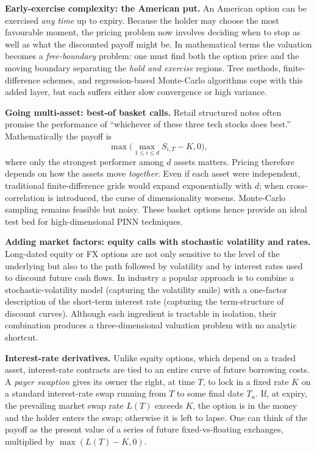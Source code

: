\documentclass[12pt]{report} %
\theoremstyle{plain}           %
\theoremstyle{definition}      %
\theoremstyle{remark}          %
\begin{document}
\medskip
\noindent\textbf{Early-exercise complexity: the American put.}
An American option can be exercised \emph{any time} up to expiry. Because the holder may choose
the most favourable moment, the pricing problem now involves deciding when to stop as well as
what the discounted payoff might be.  In mathematical terms the valuation becomes a
\emph{free-boundary} problem: one must find both the option price and the moving boundary
separating the \emph{hold and exercise} regions. Tree methods, finite-difference schemes, and
regression-based Monte-Carlo algorithms cope with this added layer, but each suffers either
slow convergence or high variance.

\medskip
\noindent\textbf{Going multi-asset: best-of basket calls.}
Retail structured notes often promise the performance of “whichever of these three tech stocks
does best.”  Mathematically the payoff is
\[
\max\bigl(\max_{1\le i\le d}S_{i,T}-K,0\bigr),
\]
where only the strongest performer among \(d\) assets matters.  Pricing therefore depends on
how the assets move \emph{together}.  
Even if each asset were independent, traditional finite-difference grids would expand
exponentially with \(d\); when cross-correlation is introduced, the curse of dimensionality
worsens. Monte-Carlo sampling remains feasible but noisy. These basket options hence provide an ideal test bed
for high-dimensional PINN techniques.

\medskip
\noindent\textbf{Adding market factors: equity calls with stochastic volatility and rates.}
Long-dated equity or FX options are not only sensitive to the level of the underlying
but also to the path followed by volatility and by interest rates used to discount future
cash flows. In industry a popular approach is to combine a
stochastic-volatility model (capturing the volatility smile) with a one-factor
description of the short-term interest rate (capturing the term-structure of discount
curves).  Although each ingredient is tractable in isolation, their combination produces a
three-dimensional valuation problem with no analytic shortcut.

\medskip
\noindent\textbf{Interest-rate derivatives.}
Unlike equity options, which depend on a traded asset, interest-rate contracts are tied
to an entire curve of future borrowing costs.  A \emph{payer swaption} gives its owner the
right, at time \(T\), to lock in a fixed rate \(K\) on a standard interest-rate swap running
from \(T\) to some final date \(T_n\).  If, at expiry, the prevailing market swap rate
\(L(T)\) exceeds \(K\), the option is in the money and the holder enters the swap; otherwise it
is left to lapse.  One can think of the payoff as the present value of a series of future
fixed-vs-floating exchanges, multiplied by \(\max(L(T)-K,0)\).
\end{document}
